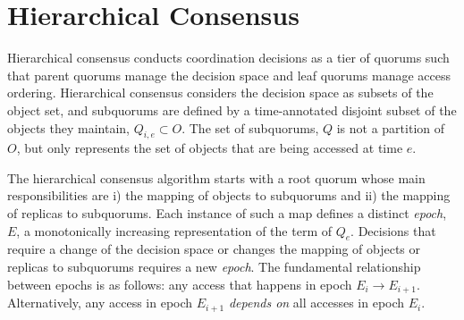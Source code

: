 \documentclass[11pt,letterpaper]{article}
\begin{document}


\section{Hierarchical Consensus}
\vspace{-.5em}

Hierarchical consensus conducts coordination decisions as a tier of quorums such that
parent quorums manage the decision space and leaf quorums manage access ordering.
Hierarchical consensus considers the decision space as subsets of the object set, and
subquorums are defined by a time-annotated disjoint subset of the objects they maintain,
$Q_{i,e} \subset O$.
The set of subquorums, $Q$ is not a partition of $O$, but only represents the set of
objects that are being accessed at time $e$.


The hierarchical consensus algorithm starts with a root quorum whose main
responsibilities are i) the mapping of objects to subquorums and ii) the
mapping of replicas to subquorums.
Each instance of such a map defines a distinct \emph{epoch}, $E$, a
monotonically increasing representation of the term of $Q_e$.
Decisions that require a change of the decision space or changes the
mapping of objects or replicas to subquorums requires a new \emph{epoch}.
The fundamental relationship between epochs is as follows: any access that
happens in epoch $E_i \rightarrow E_{i+1}$.
Alternatively, any access in epoch $E_{i+1}$ \emph{depends on} all accesses in
epoch $E_i$.
\end{document}
